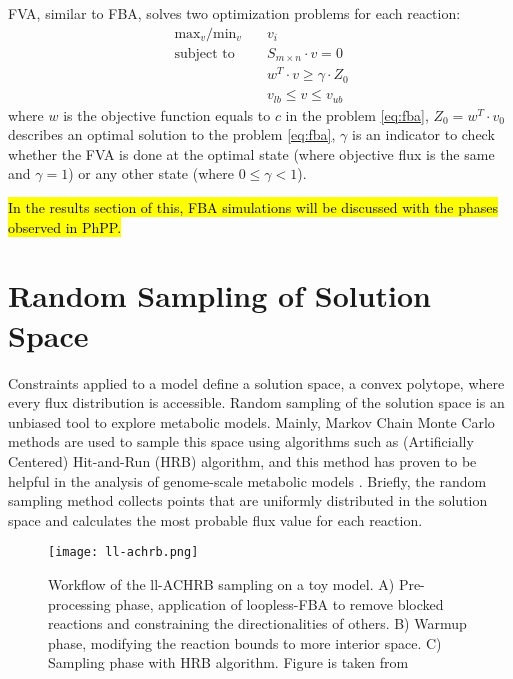 FVA, similar to FBA, solves two optimization problems for each reaction:
 \begin{align}
 \ \text{max}_v / \text{min}_v \quad & v_i \\
 \ \text{subject to} \quad & S_{m \times n} \cdot v=0 \\
 \ & w^T \cdot v \geq \gamma \cdot Z_0 \\
 \ & v_{lb} \leq v \leq v_{ub}
 \end{align}
\noindent where $w$ is the objective function equals to $c$ in the problem \ref{eq:fba}, $Z_0 = w^T \cdot v_0$ describes an optimal solution to the problem \ref{eq:fba}, $\gamma$ is an indicator to check whether the FVA is done at the optimal state (where objective flux is the same and $\gamma = 1$) or any other state (where $0 \leq \gamma < 1$).


\hl{In the results section of this, FBA simulations will be discussed with the phases observed in PhPP.}


\section{Random Sampling of Solution Space}
Constraints applied to a model define a solution space, a convex polytope, where every flux distribution is accessible. Random sampling of the solution space is an unbiased tool to explore metabolic models. Mainly, Markov Chain Monte Carlo methods are used to sample this space using algorithms such as (Artificially Centered) Hit-and-Run (HRB) \cite{kiatsupaibul2011analysis, saa2016ll} algorithm, and this method has proven to be helpful in the analysis of genome-scale metabolic models \cite{schellenberger2009use}. Briefly, the random sampling method collects points that are uniformly distributed in the solution space and calculates the most probable flux value for each reaction.

\begin{figure}[H]
\begin{center}
\texttt{[image: ll-achrb.png]}
\end{center}
\caption[Workflow of the Loopless-ACHRB sampling on a toy model]{Workflow of the ll-ACHRB sampling on a toy model. A) Pre-processing phase, application of loopless-FBA to remove blocked reactions and constraining the directionalities of others. B) Warmup phase, modifying the reaction bounds to more interior space. C) Sampling phase with HRB algorithm. Figure is taken from \cite{saa2016ll}}
\label{fig:achrb}
\end{figure}

